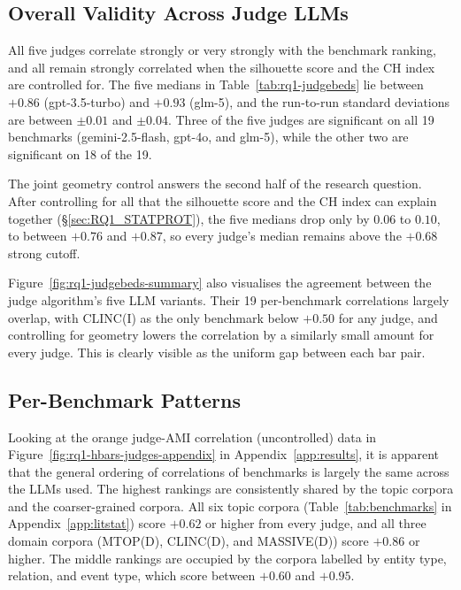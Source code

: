 \documentclass[11pt,a4paper,oneside]{report}
\begin{document}
\subsection{Overall Validity Across Judge LLMs}

All five judges correlate strongly or very strongly with the benchmark ranking, and all remain strongly correlated when the silhouette score and the CH index are controlled for. The five medians in Table~\ref{tab:rq1-judgebeds} lie between $+0.86$ ({\small\ttfamily gpt-3.5-turbo}) and $+0.93$ ({\small\ttfamily glm-5}), and the run-to-run standard deviations are between $\pm 0.01$ and $\pm 0.04$. Three of the five judges are significant on all 19 benchmarks ({\small\ttfamily gemini-2.5-flash}, {\small\ttfamily gpt-4o}, and {\small\ttfamily glm-5}), while the other two are significant on 18 of the 19.

The joint geometry control answers the second half of the research question. After controlling for all that the silhouette score and the CH index can explain together (\S\ref{sec:RQ1_STATPROT}), the five medians drop only by $0.06$ to $0.10$, to between $+0.76$ and $+0.87$, so every judge's median remains above the $+0.68$ strong cutoff.

Figure~\ref{fig:rq1-judgebeds-summary} also visualises the agreement between the judge algorithm's five LLM variants. Their 19 per-benchmark correlations largely overlap, with CLINC(I) as the only benchmark below $+0.50$ for any judge, and controlling for geometry lowers the correlation by a similarly small amount for every judge. This is clearly visible as the uniform gap between each bar pair.

\subsection{Per-Benchmark Patterns}

Looking at the orange judge-AMI correlation (uncontrolled) data in Figure~\ref{fig:rq1-hbars-judges-appendix} in Appendix~\ref{app:results}, it is apparent that the general ordering of correlations of benchmarks is largely the same across the LLMs used. The highest rankings are consistently shared by the topic corpora and the coarser-grained corpora. All six topic corpora (Table~\ref{tab:benchmarks} in Appendix~\ref{app:litstat}) score $+0.62$ or higher from every judge, and all three domain corpora (MTOP(D), CLINC(D), and MASSIVE(D)) score $+0.86$ or higher. The middle rankings are occupied by the corpora labelled by entity type, relation, and event type, which score between $+0.60$ and $+0.95$.
\end{document}
